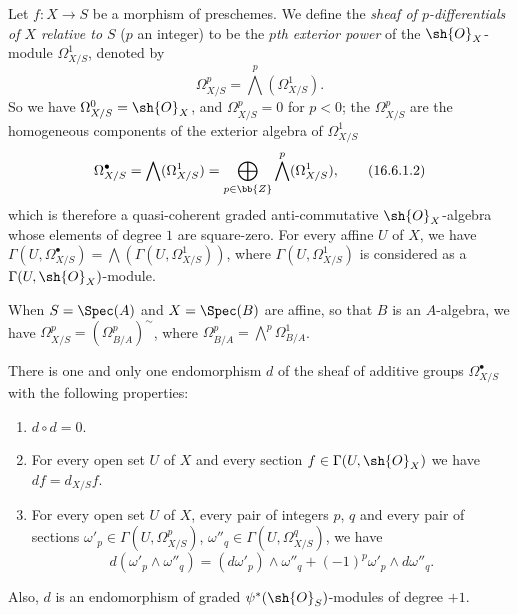 \begin{env}[16.6.1]
\label{IV.16.6.1}
Let $f:X \to S$ be a morphism of preschemes.
We define the \emph{sheaf of $p$-differentials of $X$ relative to $S$} ($p$ an integer) to be the \emph{$p$th exterior power}  of the $\sh{O}_X$-module $\Omega_{X/S}^1$, denoted by
\[
  \label{IV.16.6.1.1}
  \Omega_{X/S}^p = \bigwedge^p(\Omega_{X/S}^1).
  \tag{16.6.1.1}
\] 
So we have $\Omega_{X/S}^0 = \sh{O}_X$, and $\Omega_{X/S}^p = 0$ for $p < 0$;
the $\Omega_{X/S}^p$ are the homogeneous components of the exterior algebra of $\Omega_{X/S}^1$
\[  
  \label{IV.16.6.1.2}
  \Omega_{X/S}^\bullet = \bigwedge(\Omega_{X/S}^1) = \bigoplus_{p \in \bb{Z}}\bigwedge^p(\Omega_{X/S}^1),  
  \tag{16.6.1.2}
\] 
which is therefore a quasi-coherent graded anti-commutative $\sh{O}_X$-algebra whose elements of degree $1$ are square-zero.
For every affine $U$ of $X$, we have $\Gamma(U, \Omega_{X/S}^\bullet) = \bigwedge (\Gamma(U, \Omega_{X/S}^1))$, where $\Gamma(U, \Omega_{X/S}^1)$ is considered as a $\Gamma(U, \sh{O}_X)$-module.

When $S = \Spec(A)$ and $X = \Spec(B)$ are affine, so that $B$ is an $A$-algebra, we have  $\Omega_{X/S}^p = (\Omega_{B/A}^p)^\sim$, where $\Omega_{B/A}^p = \bigwedge^p\Omega^1_{B/A}$. 
\end{env}

\begin{theorem}[16.6.2]
\label{IV.16.6.2}
There is one and only one endomorphism $d$ of the sheaf of additive groups $\Omega_{X/S}^\bullet$ with the following properties:
\begin{enumerate}
  \item[\rm{(i)}] $d \circ d = 0$.
  \item[\rm{(ii)}] For every open set $U$ of $X$ and every section $f \in \Gamma(U, \sh{O}_X)$ we have $df = d_{X/S}f$. 
  \item[\rm{(iii)}] For every open set $U$ of $X$, every pair of integers $p$, $q$ and every pair of sections $\omega'_p \in \Gamma(U, \Omega_{X/S}^p)$, $\omega''_q \in \Gamma(U, \Omega_{X/S}^q)$, we have
  \[
    \label{IV.16.6.2.1}
    d(\omega'_p \wedge \omega''_q) = (d\omega'_p) \wedge \omega''_q + (-1)^p \omega'_p \wedge d\omega''_q.
    \tag{16.6.2.1}
  \]
\end{enumerate}
Also, $d$ is an endomorphism of graded $\psi^*(\sh{O}_S)$-modules of degree $+1$.
\end{theorem}

